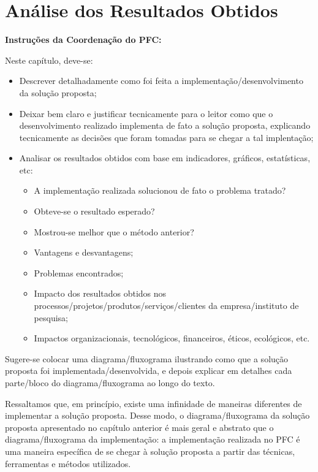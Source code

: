 \chapter{Análise dos Resultados Obtidos}

\textbf{Instruções da Coordenação do PFC:}

Neste capítulo, deve-se:
\begin{itemize}
	\item Descrever detalhadamente como foi feita a implementação/desenvolvimento da solução proposta;
	\item Deixar bem claro e justificar tecnicamente para o leitor como que o desenvolvimento realizado implementa de fato a solução proposta, explicando tecnicamente as decisões que foram tomadas para se chegar a tal implentação;
	\item Analisar os resultados obtidos com base em indicadores, gráficos, estatísticas, etc: 
	\begin{itemize}
		\item A implementação realizada solucionou de fato o problema tratado? 
		\item Obteve-se o resultado esperado? 
		\item Mostrou-se melhor que o método anterior?
		\item Vantagens e desvantagens; 
		\item Problemas encontrados;   
		\item Impacto dos resultados obtidos nos processos/projetos/produtos/serviços/clientes da empresa/instituto de pesquisa; 
		\item Impactos organizacionais, tecnológicos, financeiros, éticos, ecológicos, etc.
	\end{itemize}
\end{itemize}

Sugere-se colocar uma diagrama/fluxograma ilustrando como que a solução proposta foi implementada/desenvolvida, e depois explicar em detalhes cada parte/bloco do diagrama/fluxograma ao longo do texto. 

Ressaltamos que, em princípio, existe uma infinidade de maneiras diferentes de implementar a solução proposta. Desse modo, o diagrama/fluxograma da solução proposta apresentado no capítulo anterior é mais geral e abstrato que o diagrama/fluxograma da implementação: a implementação realizada no PFC é uma maneira específica de se chegar à solução proposta a partir das técnicas, ferramentas e métodos utilizados. 

